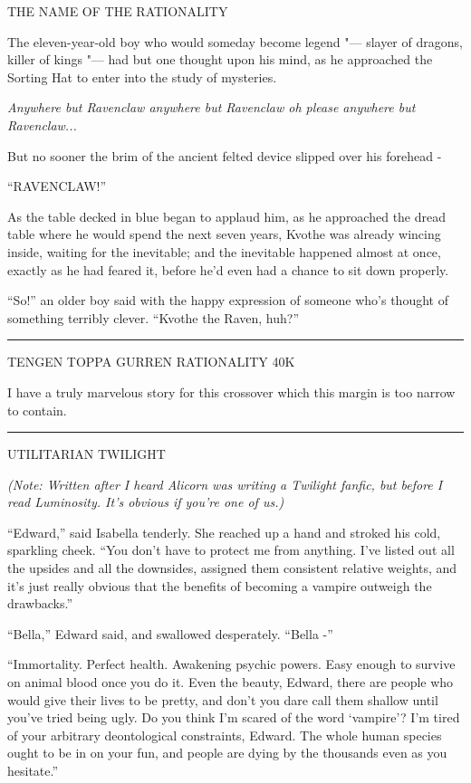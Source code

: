 THE NAME OF THE RATIONALITY

The eleven-year-old boy who would someday become legend "--- slayer of
dragons, killer of kings "--- had but one thought upon his mind, as he
approached the Sorting Hat to enter into the study of mysteries.

\emph{Anywhere but Ravenclaw anywhere but Ravenclaw oh please anywhere
but Ravenclaw...}

But no sooner the brim of the ancient felted device slipped over his
forehead -

``RAVENCLAW!''

As the table decked in blue began to applaud him, as he approached the
dread table where he would spend the next seven years, Kvothe was
already wincing inside, waiting for the inevitable; and the inevitable
happened almost at once, exactly as he had feared it, before he'd even
had a chance to sit down properly.

``So!'' an older boy said with the happy expression of someone who's
thought of something terribly clever. ``Kvothe the Raven, huh?''

\begin{center}\rule{3in}{0.4pt}\end{center}

TENGEN TOPPA GURREN RATIONALITY 40K

I have a truly marvelous story for this crossover which this margin is
too narrow to contain.

\begin{center}\rule{3in}{0.4pt}\end{center}

UTILITARIAN TWILIGHT

\emph{(Note: Written after I heard Alicorn was writing a Twilight
fanfic, but before I read Luminosity. It's obvious if you're one of
us.)}

``Edward,'' said Isabella tenderly. She reached up a hand and stroked
his cold, sparkling cheek. ``You don't have to protect me from anything.
I've listed out all the upsides and all the downsides, assigned them
consistent relative weights, and it's just really obvious that the
benefits of becoming a vampire outweigh the drawbacks.''

``Bella,'' Edward said, and swallowed desperately. ``Bella -''

``Immortality. Perfect health. Awakening psychic powers. Easy enough to
survive on animal blood once you do it. Even the beauty, Edward, there
are people who would give their lives to be pretty, and don't you dare
call them shallow until you've tried being ugly. Do you think I'm scared
of the word `vampire'? I'm tired of your arbitrary deontological
constraints, Edward. The whole human species ought to be in on your fun,
and people are dying by the thousands even as you hesitate.''

